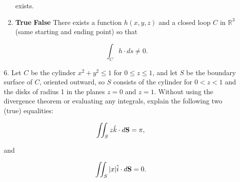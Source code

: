 \documentclass[12 pt]{report}
\begin{document}
\begin{enumerate}
\begin{enumerate}
exists.

\vfill

\item \textbf{True} \hspace{5pt} \textbf{False} \hspace{10pt} There exists a function $h(x,y,z)$ and a closed loop $C$ in $\mathbb{R}^3$ (same starting and ending point) so that 

\[
\int_C h \cdot ds \neq 0.
\]

\vfill

\end{enumerate}

\newpage

\item[6.] Let $C$ be the cylinder $x^2 + y^2 \leq 1$ for $0 \leq z \leq 1$, and let $S$ be the boundary surface of $C$, oriented outward, so $S$ consists of the cylinder for $0 < z < 1$ and the disks of radius 1 in the planes $z = 0$ and $z = 1$. Without using the divergence theorem or evaluating any integrals, explain the following two (true) equalities:

\[
\iint_S z\hat{k} \cdot d\bold{S} = \pi,
\]

and

\[
\iint_S |x| \hat{i} \cdot d\bold{S} = 0.
\]

\vfill

\end{enumerate}
\end{document}
